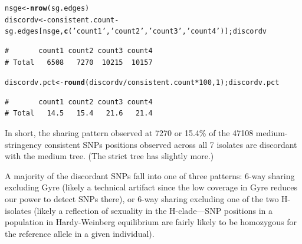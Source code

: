 \documentclass{article}\usepackage[]{graphicx}\usepackage[]{color}
\makeatletter
\newcommand{\hlnum}[1]{\textcolor[rgb]{0.686,0.059,0.569}{#1}}%
\newcommand{\hlstr}[1]{\textcolor[rgb]{0.192,0.494,0.8}{#1}}%
\newcommand{\hlopt}[1]{\textcolor[rgb]{0,0,0}{#1}}%
\newcommand{\hlstd}[1]{\textcolor[rgb]{0.345,0.345,0.345}{#1}}%
\newcommand{\hlkwb}[1]{\textcolor[rgb]{0.69,0.353,0.396}{#1}}%
\newcommand{\hlkwd}[1]{\textcolor[rgb]{0.737,0.353,0.396}{\textbf{#1}}}%
\newenvironment{kframe}{%
 \def\at@end@of@kframe{}%
 \ifinner\ifhmode%
  \def\at@end@of@kframe{\end{minipage}}%
  \begin{minipage}{\columnwidth}%
 \fi\fi%
 \def\FrameCommand##1{\hskip\@totalleftmargin \hskip-\fboxsep
 \colorbox{shadecolor}{##1}\hskip-\fboxsep
     \hskip-\linewidth \hskip-\@totalleftmargin \hskip\columnwidth}%
 \MakeFramed {\advance\hsize-\width
   \@totalleftmargin\z@ \linewidth\hsize
   \@setminipage}}%
 {\par\unskip\endMakeFramed%
 \at@end@of@kframe}
\newenvironment{knitrout}{}{} %
\makeatother
\begin{document}
\begin{knitrout}\scriptsize
{}\color{fgcolor}\begin{kframe}
\begin{alltt}
\hlstd{nsge} \hlkwb{<-} \hlkwd{nrow}\hlstd{(sg.edges)}
\hlstd{discordv} \hlkwb{<-} \hlstd{consistent.count} \hlopt{-} \hlstd{sg.edges[nsge,}\hlkwd{c}\hlstd{(}\hlstr{'count1'}\hlstd{,}\hlstr{'count2'}\hlstd{,}\hlstr{'count3'}\hlstd{,}\hlstr{'count4'}\hlstd{)] ; discordv}
\end{alltt}
\begin{verbatim}
#       count1 count2 count3 count4
# Total   6508   7270  10215  10157
\end{verbatim}
\begin{alltt}
\hlstd{discordv.pct} \hlkwb{<-} \hlkwd{round}\hlstd{(discordv}\hlopt{/}\hlstd{consistent.count}\hlopt{*}\hlnum{100}\hlstd{,}\hlnum{1}\hlstd{) ; discordv.pct}
\end{alltt}
\begin{verbatim}
#       count1 count2 count3 count4
# Total   14.5   15.4   21.6   21.4
\end{verbatim}
\end{kframe}
\end{knitrout}

In short, the sharing pattern observed at 7270 or 15.4\% of the 
47108 medium-stringency consistent SNPs positions observed across all 7 
isolates are discordant with the medium tree.  (The strict tree has slightly more.)  

A majority of the discordant SNPs fall into one of three patterns: 6-way sharing excluding Gyre 
(likely a technical artifact since the low coverage in Gyre reduces our power to detect SNPs there), 
or 6-way sharing excluding one of the two H-isolates (likely a reflection of sexuality in the 
H-clade---SNP positions in a population in Hardy-Weinberg equilibrium are fairly likely to be 
homozygous for the reference allele in a given individual).
\end{document}
